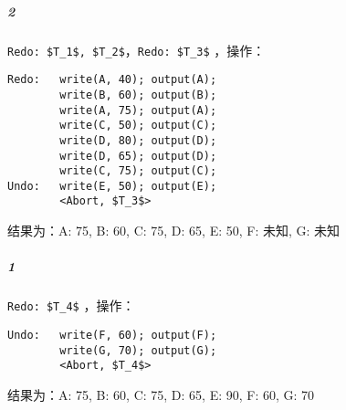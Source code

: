 \documentclass{article}
\begin{document}
    \subparagraph{\textcircled{2}}
    \lstinline[style = transaction]{Redo: $T_1$, $T_2$}，\lstinline[style = transaction]{Redo: $T_3$}
，操作：
\begin{lstlisting}[style = transaction]
Redo:   write(A, 40); output(A);
        write(B, 60); output(B);
        write(A, 75); output(A);
        write(C, 50); output(C);
        write(D, 80); output(D);
        write(D, 65); output(D);
        write(C, 75); output(C);
Undo:   write(E, 50); output(E);
        <Abort, $T_3$>
\end{lstlisting}
结果为：A: 75, B: 60, C: 75, D: 65, E: 50, F: 未知, G: 未知

\subparagraph{\textcircled{1}}
\lstinline[style = transaction]{Redo: $T_4$}
，操作：
\begin{lstlisting}[style = transaction]
Undo:   write(F, 60); output(F);
        write(G, 70); output(G);
        <Abort, $T_4$>
\end{lstlisting}
结果为：A: 75, B: 60, C: 75, D: 65, E: 90, F: 60, G: 70
\end{document}

